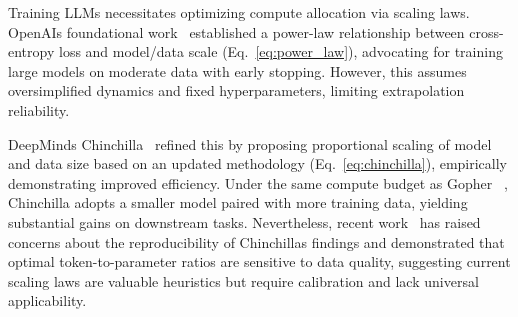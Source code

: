 \documentclass{article}
\begin{document}


Training LLMs necessitates optimizing compute allocation via scaling laws. OpenAIs foundational work~\cite{kaplan2020scaling} established a power-law relationship between cross-entropy loss and model/data scale (Eq.~\ref{eq:power_law}), advocating for training large models on moderate data with early stopping. However, this assumes oversimplified dynamics and fixed hyperparameters, limiting extrapolation reliability.

DeepMinds Chinchilla~\cite{hoffmann_training_2022} refined this by proposing proportional scaling of model and data size based on an updated methodology (Eq.~\ref{eq:chinchilla}), empirically demonstrating improved efficiency. Under the same compute budget as Gopher ~\cite{rae2021scaling}, Chinchilla adopts a smaller model paired with more training data, yielding substantial gains on downstream tasks. Nevertheless, recent work~\cite{blu2024re} has raised concerns about the reproducibility of Chinchillas findings and demonstrated that optimal token-to-parameter ratios are sensitive to data quality, suggesting current scaling laws are valuable heuristics but require calibration and lack universal applicability.
\end{document}
